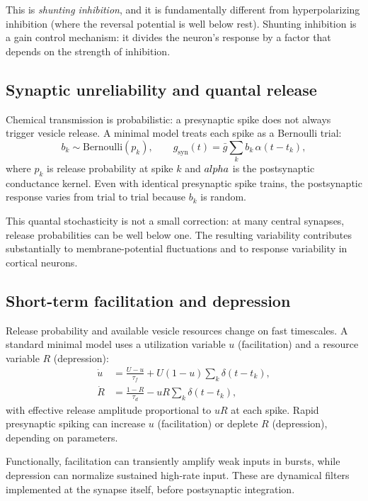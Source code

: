 This is \emph{shunting inhibition}, and it is fundamentally different from hyperpolarizing inhibition (where the reversal potential is well below rest). Shunting inhibition is a gain control mechanism: it divides the neuron's response by a factor that depends on the strength of inhibition.

\subsection{Synaptic unreliability and quantal release}

Chemical transmission is probabilistic: a presynaptic spike does not always trigger vesicle release. A minimal model treats each spike as a Bernoulli trial:
%
\begin{equation}
  b_k \sim \mathrm{Bernoulli}(p_k), \qquad
  g_{\text{syn}}(t)=\bar g\sum_k b_k\,\alpha(t-t_k),
  \label{eq:bernoulli-release}
\end{equation}
%
where $p_k$ is release probability at spike $k$ and $\\alpha$ is the postsynaptic conductance kernel. Even with identical presynaptic spike trains, the postsynaptic response varies from trial to trial because $b_k$ is random.

This quantal stochasticity is not a small correction: at many central synapses, release probabilities can be well below one. The resulting variability contributes substantially to membrane-potential fluctuations and to response variability in cortical neurons.

\subsection{Short-term facilitation and depression}

Release probability and available vesicle resources change on fast timescales. A standard minimal model uses a utilization variable $u$ (facilitation) and a resource variable $R$ (depression):
%
\begin{align}
  \dot u &= \frac{U-u}{\tau_f} + U(1-u)\sum_k \delta(t-t_k), \label{eq:stp-u} \\
  \dot R &= \frac{1-R}{\tau_d} - uR\sum_k \delta(t-t_k), \label{eq:stp-r}
\end{align}
%
with effective release amplitude proportional to $uR$ at each spike. Rapid presynaptic spiking can increase $u$ (facilitation) or deplete $R$ (depression), depending on parameters.

Functionally, facilitation can transiently amplify weak inputs in bursts, while depression can normalize sustained high-rate input. These are dynamical filters implemented at the synapse itself, before postsynaptic integration.


